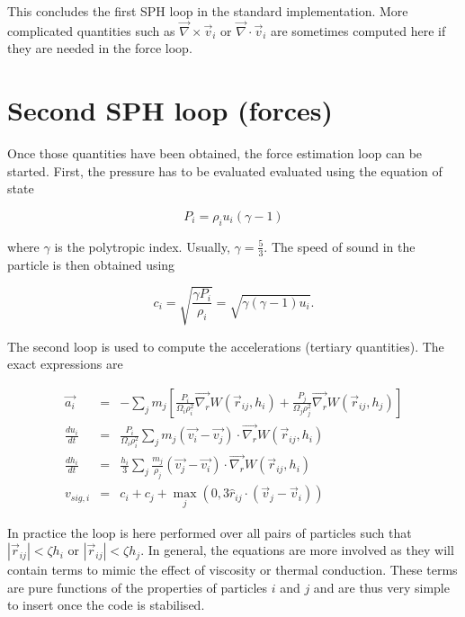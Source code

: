 \documentclass[a4paper,10pt]{report}
\begin{document}
This concludes the first SPH loop in the standard implementation. More complicated quantities such as
$\vec\nabla\times\vec v_i$ or $\vec\nabla\cdot\vec v_i$ are sometimes computed here if they are needed in the force
loop.

\section{Second SPH loop (forces)}
\label{sec:forces}

Once those quantities have been obtained, the force estimation loop can be started.
First, the pressure has to be evaluated evaluated using the equation of state

\begin{equation}
\label{eq:pressure}
 P_i = \rho_i u_i (\gamma - 1)
\end{equation}

where $\gamma$ is the polytropic index. Usually, $\gamma = \frac{5}{3}$. The speed of sound in the particle is then
obtained using

\begin{equation}
 c_i = \sqrt{\frac{\gamma P_i}{\rho_i}} = \sqrt{\gamma (\gamma-1)u_i}.
\end{equation}

The second loop is used to compute the accelerations (tertiary quantities). The exact expressions are

\begin{eqnarray}
 \vec{a_i} &=& - \sum_j m_j\left[\frac{P_i}{\Omega_i\rho_i^2}\vec{\nabla_r} W(\vec{r}_{ij}, h_i) +
\frac{P_j}{\Omega_j\rho_j^2}\vec{\nabla_r}W(\vec{r}_{ij}, h_j) \right] \label{eq:acceleration}\\
 \frac{du_i}{dt} &=& \frac{P_i}{\Omega_i\rho_i^2} \sum_j m_j
(\vec{v_i}-\vec{v_j})\cdot\vec{\nabla_r} W(\vec{r}_{ij}, h_i)
\label{eq:dudt}\\
 \frac{dh_i}{dt} &=& \frac{h_i}{3}\sum_j \frac{m_j}{\rho_j} \left(\vec{v_j} - \vec{v_i} \right)
\cdot\vec{\nabla_r}W(\vec{r}_{ij}, h_i)\\
 v_{sig,i} &=& c_i + c_j + \max_j(0, 3\hat{r}_{ij} \cdot (\vec{v}_j - \vec{v}_i)) \label{eq:sigvel}
\end{eqnarray}

In practice the loop is here performed over all pairs of particles such that $|\vec{r}_{ij}| < \zeta h_i$ or
$|\vec{r}_{ij}| < \zeta
h_j$. In general, the equations are more involved as they will contain terms to mimic the effect of viscosity or
thermal conduction. These terms are pure functions of the properties of particles $i$ and $j$ and are thus very simple
to insert once the code is stabilised.\\
\end{document}
